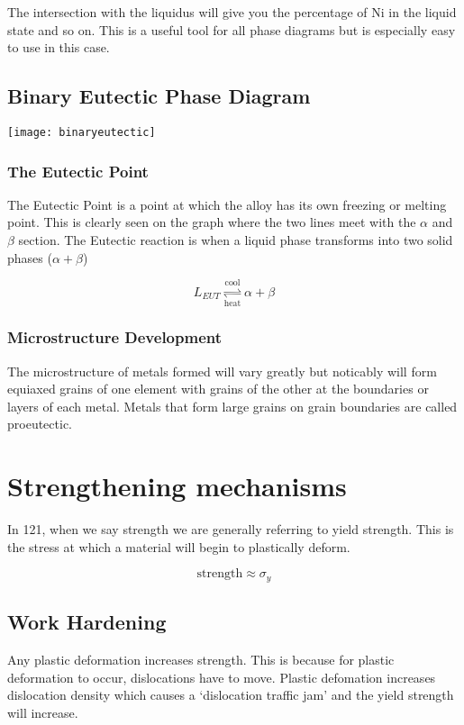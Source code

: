 \documentclass[12pt]{article}
\begin{document}
The intersection with the liquidus will give you the percentage of Ni in the liquid state and so on.
This is a useful tool for all phase diagrams but is especially easy to use in this case.


\subsection{Binary Eutectic Phase Diagram}
\begin{center}
  \texttt{[image: binaryeutectic]}
\end{center}

\subsubsection{The Eutectic Point}
The Eutectic Point is a point at which the alloy has its own freezing or melting point.
This is clearly seen on the graph where the two lines meet with the $\alpha$ and $\beta$ section.
The Eutectic reaction is when a liquid phase transforms into two solid phases ($\alpha+\beta$)

\begin{equation*}
  L_{EUT} \underset{\text{heat}}{\stackrel{\text{cool}}{\rightleftharpoons}} \alpha + \beta 
\end{equation*}

\subsubsection{Microstructure Development}
The microstructure of metals formed will vary greatly but noticably will form equiaxed grains of one element with grains of the other at the boundaries or layers of each metal.
Metals that form large grains on grain boundaries are called proeutectic.

\section{Strengthening mechanisms}
In 121, when we say strength we are generally referring to yield strength.
This is the stress at which a material will begin to plastically deform.  

\begin{equation*}
  \text{strength} \approx \sigma_y
\end{equation*}

\subsection{Work Hardening}
Any plastic deformation increases strength.
This is because for plastic deformation to occur, dislocations have to move. 
Plastic defomation increases dislocation density which causes a `dislocation traffic jam' and the yield strength will increase.
\end{document}
